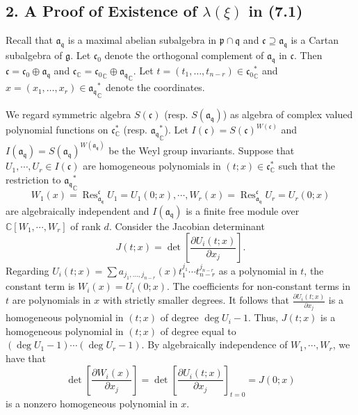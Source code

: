 \documentclass[a4paper]{amsart}
\theoremstyle{plain}
\theoremstyle{definition}
\def\deg{\operatorname{deg}}
\def\det{\operatorname{det}}
\def\deg{\operatorname{deg}}
\def\Res{\operatorname{Res}}
\newcommand{\fra}{\mathfrak{a}}
\newcommand{\frc}{\mathfrak{c}}
\newcommand{\frg}{\mathfrak{g}}
\newcommand{\frp}{\mathfrak{p}}
\newcommand{\frq}{\mathfrak{q}}
\newcommand{\bbC}{\mathbb{C}}
\newcommand{\del}{\partial}
\begin{document}
\subsection*{2. A Proof of Existence of $\lambda(\xi)$ in (7.1)}
Recall that $\fra_\frq$ is a maximal abelian subalgebra in $\frp\cap \frq$ and $\frc\supseteq \fra_\frq$ is a Cartan subalgebra of $\frg$.
Let $\frc_0$ denote the orthogonal complement of $\fra_\frq$ in $\frc$.
Then $\frc=\frc_0\oplus\fra_\frq$ and $\frc_\bbC={\frc_0}_\bbC\oplus {\fra_\frq}_\bbC$. Let $t=(t_1,\ldots,t_{n-r})\in{\frc_0}^*_\bbC$ and $x=(x_1,\ldots,x_r)\in{\fra_\frq}^*_\bbC$ denote the coordinates.

We regard symmetric algebra $S(\frc)$ (resp. $S(\fra_\frq)$) as algebra of complex valued polynomial functions on $\frc_\bbC^*$
(resp.  ${\fra_\frq}^*_\bbC$).
Let $I(\frc)=S(\frc)^{W(\frc)}$ and $I(\fra_\frq)=S(\fra_\frq)^{W(\fra_\frq)}$ be the Weyl group invariants. Suppose that $U_1,\cdots,U_r\in I(\frc)$ are homogeneous polynomials in $(t;x)\in \frc^*_\bbC$
such that the restriction to ${\fra_\frq}_\bbC^*$
$$W_1(x)=\Res^\frc_{\fra_\frq}U_1=U_1(0;x),\cdots,W_r(x)=\Res^\frc_{\fra_\frq}U_r=U_r(0;x)$$ are algebraically independent and
$I(\fra_\frq)$ is a finite free module over $\bbC[W_1,\cdots,W_r]$ of rank $d$.
Consider the Jacobian determinant
$$J(t;x)=\det\left[ \frac{\del U_i(t;x)}{\del x_j} \right].$$
Regarding $U_i(t;x)=\sum a_{j_1,\dots,j_{n-r}}(x)t_1^{j_1}\cdots t_{n-r}^{j_{n-r}}$ as a polynomial in $t$, the constant
term is $W_i(x)=U_i(0;x)$. The
coefficients for non-constant terms in $t$ are polynomials in $x$ with strictly smaller degrees.
It follows that $\frac{\del U_i(t;x)}{\del x_j}$ is a homogeneous
polynomial in $(t;x)$ of degree $\deg U_i-1$.
Thus, $J(t;x)$ is a homogeneous polynomial in $(t;x)$ of degree equal to $(\deg U_1-1) \cdots(\deg U_r -1)$.
By algebraically independence of $W_1,\cdots, W_r$, we have that
$$\det\left[ \frac{\del W_i(x)}{\del x_j} \right]=\det\left[ \frac{\del U_i(t;x)}{\del x_j} \right]_{t=0}=J(0;x)$$
is a nonzero homogeneous polynomial in $x$.
\end{document}
